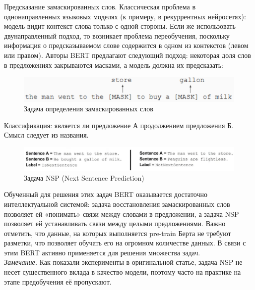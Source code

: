 \documentclass[12pt,a4paper]{article}
\begin{document}
\noindent Предсказание замаскированных слов. Классическая проблема в однонаправленных языковых моделях (к примеру, в рекуррентных нейросетях): модель видит контекст слова только с одной стороны. Если же использовать двунаправленный подход, то возникает проблема переобучения, поскольку информация о предсказываемом слове содержится в одном из контекстов (левом или правом). Авторы BERT предлагают следующий подход: некоторая доля слов в предложениях закрываются масками, а модель должна их предсказать:

\begin{figure}[H]
	\begin{center}
		\includegraphics[scale=0.4]{masked.png}
	\end{center}
	\caption{Задача определения замаскированных слов}
\end{figure}


\noindent Классификация: является ли предложение А продолжением предложения Б. Смысл следует из названия.  
\begin{figure}[H]
	\begin{center}
		\includegraphics[scale=0.5]{nsp.png}
	\end{center}
	\caption{Задача NSP (Next Sentence Prediction)}
\end{figure}

\noindent Обученный для решения этих задач BERT оказывается достаточно интеллектуальной системой: задача восстановления замаскированных слов позволяет ей «понимать» связи между словами в предложении, а задача NSP позволяет ей устанавливать связи между целыми предложениями. Важно отметить, что данные, на которых выполняется pre-train Берта не требуют разметки, что позволяет обучать его на огромном количестве данных. В связи с этим BERT активно применяется для решения множества задач.\\

\noindent \textit{Замечание.} Как показали эксперименты в оригинальной статье, задача NSP не несет существенного вклада в качество модели, поэтому часто на практике на этапе предобучения её пропускают.\\
\end{document}
